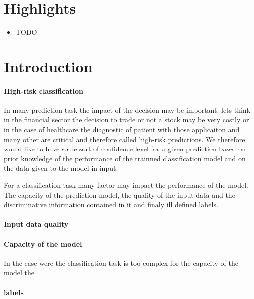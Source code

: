 \documentclass[authoryear]{elsarticle}
\begin{document}
\section*{Highlights}

\begin{itemize}
\item TODO
\end{itemize}

\section{Introduction}
\paragraph{High-risk classification}
In many prediction task the impact of the decision may be important. lets think in the financial sector the decision to trade or not a stock may be very costly or in the case of healthcare the diagnostic of patient with  those applicaiton and many other are critical and therefore called high-risk predictions. We therefore would like to have some sort of confidence level for a given prediction based on prior knowledge of the performance of the trainned classification model and on the data given to the model in input.

For a classification task many factor may impact the performance of the model. The capacity of the prediction model, the quality of the input data and the discriminative information contained in it and finaly  ill defined labels.
\paragraph{Input data quality}
\paragraph{Capacity of the model}
In the case were the classification task is too complex for the capacity of the model the 

\paragraph{labels}

\end{document}
